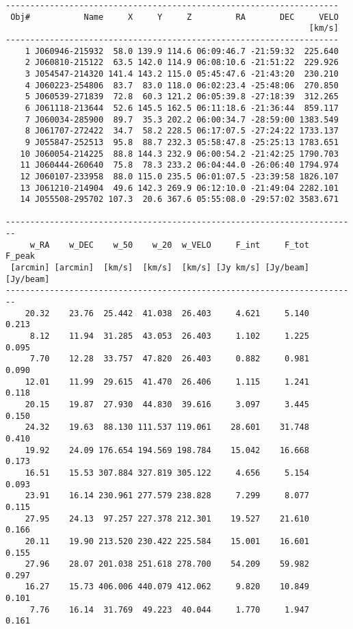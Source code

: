 {\footnotesize
\begin{verbatim}
--------------------------------------------------------------------
 Obj#           Name     X     Y     Z         RA       DEC     VELO
                                                              [km/s]
--------------------------------------------------------------------
    1 J060946-215932  58.0 139.9 114.6 06:09:46.7 -21:59:32  225.640
    2 J060810-215122  63.5 142.0 114.9 06:08:10.6 -21:51:22  229.926
    3 J054547-214320 141.4 143.2 115.0 05:45:47.6 -21:43:20  230.210
    4 J060223-254806  83.7  83.0 118.0 06:02:23.4 -25:48:06  270.850
    5 J060539-271839  72.8  60.3 121.2 06:05:39.8 -27:18:39  312.265
    6 J061118-213644  52.6 145.5 162.5 06:11:18.6 -21:36:44  859.117
    7 J060034-285900  89.7  35.3 202.2 06:00:34.7 -28:59:00 1383.549
    8 J061707-272422  34.7  58.2 228.5 06:17:07.5 -27:24:22 1733.137
    9 J055847-252513  95.8  88.7 232.3 05:58:47.8 -25:25:13 1783.651
   10 J060054-214225  88.8 144.3 232.9 06:00:54.2 -21:42:25 1790.703
   11 J060444-260640  75.8  78.3 233.2 06:04:44.0 -26:06:40 1794.974
   12 J060107-233958  88.0 115.0 235.5 06:01:07.5 -23:39:58 1826.107
   13 J061210-214904  49.6 142.3 269.9 06:12:10.0 -21:49:04 2282.101
   14 J055508-295702 107.3  20.6 367.6 05:55:08.0 -29:57:02 3583.671

------------------------------------------------------------------------
     w_RA    w_DEC    w_50    w_20  w_VELO     F_int     F_tot    F_peak
 [arcmin] [arcmin]  [km/s]  [km/s]  [km/s] [Jy km/s] [Jy/beam] [Jy/beam]
------------------------------------------------------------------------
    20.32    23.76  25.442  41.038  26.403     4.621     5.140     0.213
     8.12    11.94  31.285  43.053  26.403     1.102     1.225     0.095
     7.70    12.28  33.757  47.820  26.403     0.882     0.981     0.090
    12.01    11.99  29.615  41.470  26.406     1.115     1.241     0.118
    20.15    19.87  27.930  44.830  39.616     3.097     3.445     0.150
    24.32    19.63  88.130 111.537 119.061    28.601    31.748     0.410
    19.92    24.09 176.654 194.569 198.784    15.042    16.668     0.173
    16.51    15.53 307.884 327.819 305.122     4.656     5.154     0.093
    23.91    16.14 230.961 277.579 238.828     7.299     8.077     0.115
    27.95    24.13  97.257 227.378 212.301    19.527    21.610     0.166
    20.11    19.90 213.520 230.422 225.584    15.001    16.601     0.155
    27.96    28.07 201.038 251.618 278.700    54.209    59.982     0.297
    16.27    15.73 406.006 440.079 412.062     9.820    10.849     0.101
     7.76    16.14  31.769  49.223  40.044     1.770     1.947     0.161


\end{verbatim}}
